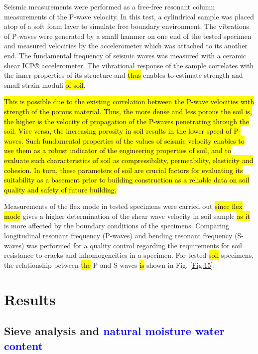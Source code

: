 \documentclass[USenglish,twocolumn]{article}
\begin{document}
Seismic measurements were performed as a free-free resonant column measurements of the P-wave velocity. In this test, a cylindrical sample was placed atop of a soft foam layer to simulate free boundary environment. The vibrations of P-waves were generated by a small hammer on one end of the tested specimen and measured velocities by the accelerometer which was attached to its another end. The fundamental frequency of seismic waves was measured with a ceramic shear ICP® accelerometer. The vibrational response of the sample correlates with the inner properties of its structure and \hl{thus }enables to estimate strength and small-strain moduli \hl{of soil}. 

\hl{This is possible due to the existing correlation between the P-wave velocities with strength of the porous material. Thus, the more dense and less porous the soil is, the higher is the velocity of propagation of the P-waves penetrating through the soil. Vice versa, the increasing porosity in soil results in the lower speed of P-waves. Such fundamental properties of the values of seismic velocity enables to use them as a robust indicator of the engineering properties of soil, and to evaluate such characteristics of soil as compressibility, permeability, elasticity and cohesion. In turn, these parameters of soil are crucial factors for evaluating its suitability as a basement prior to building construction as a reliable data on soil quality and safety of future building.}

Measurements of the flex mode in tested specimens were\hl{ }carried out \hl{since flex mode} gives a higher determination of the shear wave velocity in soil sample \hl{as it} is more affected by the boundary conditions of the specimens. Comparing longitudinal resonant frequency (P-waves) and bending resonant frequency (S-waves) was performed for a quality control regarding the requirements for soil resistance to cracks and inhomogeneities in a specimen. For tested \hl{soil }specimens, the relationship between \hl{the }P and S waves \hl{is} shown in Fig. \ref{Fig:15}.

\section{Results}\label{sec:5}

\subsection{Sieve analysis and \textcolor{blue}{natural moisture water content}}
\end{document}
